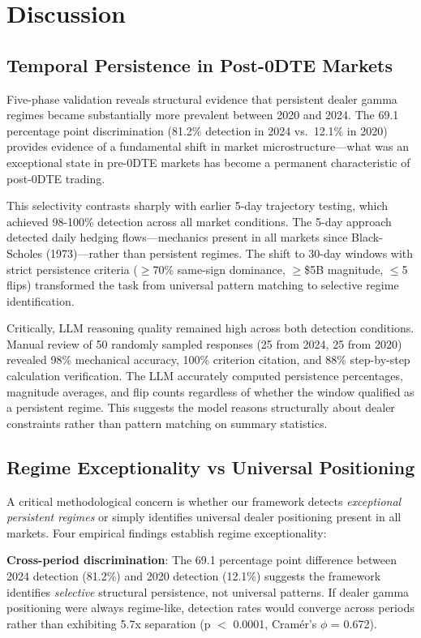 \section{Discussion}

\subsection{Temporal Persistence in Post-0DTE Markets}

Five-phase validation reveals structural evidence that persistent dealer gamma regimes became substantially more prevalent between 2020 and 2024. The 69.1 percentage point discrimination (81.2\% detection in 2024 vs.\ 12.1\% in 2020) provides evidence of a fundamental shift in market microstructure---what was an exceptional state in pre-0DTE markets has become a permanent characteristic of post-0DTE trading.

This selectivity contrasts sharply with earlier 5-day trajectory testing, which achieved 98-100\% detection across all market conditions. The 5-day approach detected daily hedging flows—mechanics present in all markets since Black-Scholes (1973)—rather than persistent regimes. The shift to 30-day windows with strict persistence criteria ($\geq$70\% same-sign dominance, $\geq$\$5B magnitude, $\leq$5 flips) transformed the task from universal pattern matching to selective regime identification.

Critically, LLM reasoning quality remained high across both detection conditions. Manual review of 50 randomly sampled responses (25 from 2024, 25 from 2020) revealed 98\% mechanical accuracy, 100\% criterion citation, and 88\% step-by-step calculation verification. The LLM accurately computed persistence percentages, magnitude averages, and flip counts regardless of whether the window qualified as a persistent regime. This suggests the model reasons structurally about dealer constraints rather than pattern matching on summary statistics.

\subsection{Regime Exceptionality vs Universal Positioning}

A critical methodological concern is whether our framework detects \textit{exceptional persistent regimes} or simply identifies universal dealer positioning present in all markets. Four empirical findings establish regime exceptionality:

\textbf{Cross-period discrimination}: The 69.1 percentage point difference between 2024 detection (81.2\%) and 2020 detection (12.1\%) suggests the framework identifies \textit{selective} structural persistence, not universal patterns. If dealer gamma positioning were always regime-like, detection rates would converge across periods rather than exhibiting 5.7x separation (p $<$ 0.0001, Cram\'er's $\phi$ = 0.672).

